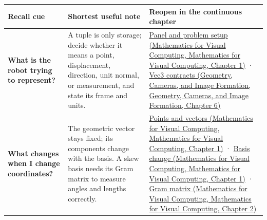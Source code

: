 {\def\LTcaptype{none} %
\begin{longtable}[]{@{}
  >{\raggedright\arraybackslash}p{}
  >{\raggedright\arraybackslash}p{}
  >{\raggedright\arraybackslash}p{}@{}}
\toprule\noalign{}
\begin{minipage}[b]{\linewidth}\raggedright
Recall cue
\end{minipage} & \begin{minipage}[b]{\linewidth}\raggedright
Shortest useful note
\end{minipage} & \begin{minipage}[b]{\linewidth}\raggedright
Reopen in the continuous chapter
\end{minipage} \\
\midrule\noalign{}
\endhead
\bottomrule\noalign{}
\endlastfoot
\textbf{What is the robot trying to represent?} & A tuple is only storage; decide whether it means a point, displacement, direction, unit normal, or measurement, and state its frame and units. & \href{../02-Mathematics-for-Visual-Computing/main.pdf\#nameddest=01-foundations-i-ch017-the-panel-gives-us-a-reason-to-learn}{Panel and problem setup (Mathematics for Visual Computing, Mathematics for Visual Computing, Chapter 1)} · \href{../03-Geometry-Cameras-and-Image-Formation/main.pdf\#nameddest=02-foundations-ii-ch037-three-stored-numbers-are-not-the-complete-contract}{Vec3 contracts (Geometry, Cameras, and Image Formation, Geometry, Cameras, and Image Formation, Chapter 6)} \\
\textbf{What changes when I change coordinates?} & The geometric vector stays fixed; its components change with the basis. A skew basis needs its Gram matrix to measure angles and lengths correctly. & \href{../02-Mathematics-for-Visual-Computing/main.pdf\#nameddest=01-foundations-i-ch017-an-arrow-is-not-the-address-written-beside-it}{Points and vectors (Mathematics for Visual Computing, Mathematics for Visual Computing, Chapter 1)} · \href{../02-Mathematics-for-Visual-Computing/main.pdf\#nameddest=01-foundations-i-ch017-a-basis-is-a-measuring-arrangement-not-the-vector-itself}{Basis change (Mathematics for Visual Computing, Mathematics for Visual Computing, Chapter 1)} · \href{../02-Mathematics-for-Visual-Computing/main.pdf\#nameddest=01-foundations-i-ch018-a-gram-matrix-remembers-the-geometry-of-a-slanted-basis}{Gram matrix (Mathematics for Visual Computing, Mathematics for Visual Computing, Chapter 2)} \\

\end{longtable}}
